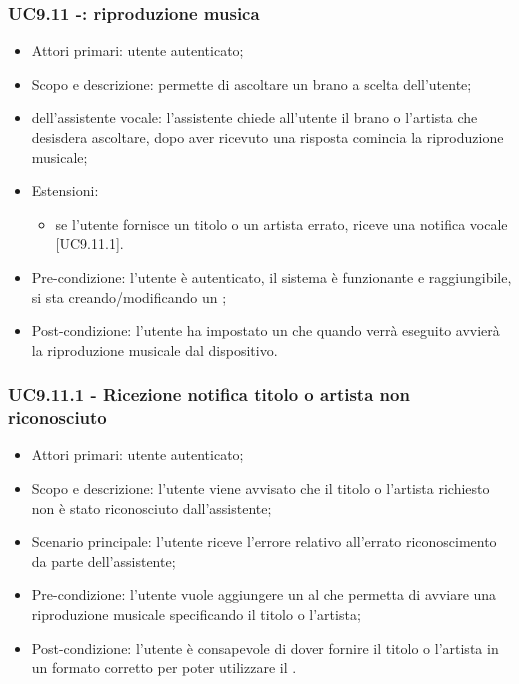 \subsubsection{UC9.11 -: riproduzione musica}
\begin{itemize}
	\item  Attori primari: utente autenticato;
	\item  Scopo e descrizione: permette di ascoltare un brano a scelta dell'utente;
	\item  {} dell'assistente vocale: l'assistente chiede all'utente il brano o l'artista che desisdera ascoltare, dopo aver ricevuto una risposta comincia la riproduzione musicale;
	\item  Estensioni:
		   \begin{itemize}
				\item se l'utente fornisce un titolo o un artista errato, riceve una notifica vocale [UC9.11.1].
		   \end{itemize}
	\item  Pre-condizione: l'utente è autenticato, il sistema è funzionante e raggiungibile, si sta creando/modificando un ;
	\item  Post-condizione: l'utente ha impostato un  che quando verrà eseguito avvierà la riproduzione musicale dal dispositivo.
\end{itemize}
\subsubsection{UC9.11.1 - Ricezione notifica titolo o artista non riconosciuto}
\begin{itemize}
	\item  Attori primari: utente autenticato;
	\item  Scopo e descrizione: l'utente viene avvisato che il titolo o l'artista richiesto non è stato riconosciuto dall'assistente;
	\item  Scenario principale: l'utente riceve l'errore relativo all'errato riconoscimento da parte dell'assistente;
	\item  Pre-condizione: l'utente vuole aggiungere un  al  che permetta di avviare una riproduzione musicale specificando il titolo o l'artista;
	\item  Post-condizione: l'utente è consapevole di dover fornire il titolo o l'artista in un formato corretto per poter utilizzare il .
\end{itemize}
